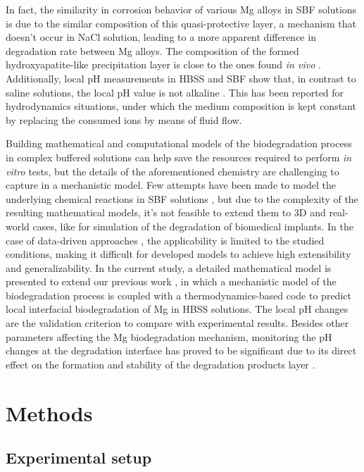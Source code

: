 In fact, the similarity in corrosion behavior of various Mg alloys in \gls{SBF} solutions is due to the similar composition of this quasi-protective layer, a mechanism that doesn't occur in NaCl solution, leading to a more apparent difference in degradation rate between Mg alloys. The composition of the formed hydroxyapatite-like precipitation layer is close to the ones found \textit{in vivo} \cite{Mei2020}. Additionally, local pH measurements in \gls{HBSS} and \gls{SBF} show that, in contrast to saline solutions, the local pH value is not alkaline \cite{Lamaka2018,Mei2021}. This has been reported for hydrodynamics situations, under which the medium composition is kept constant by replacing the consumed ions by means of fluid flow.

Building mathematical and computational models of the biodegradation process in complex buffered solutions can help save the resources required to perform \textit{in vitro} tests, but the details of the aforementioned chemistry are challenging to capture in a mechanistic model. Few attempts have been made to model the underlying chemical reactions in \gls{SBF} solutions \cite{Hoche2014,Dolgikh2019,Zeller-Plumhoff2022}, but due to the complexity of the resulting mathematical models, it's not feasible to extend them to 3D and real-world cases, like for simulation of the degradation of biomedical implants. In the case of data-driven approaches \cite{Zeller-Plumhoff2021}, the applicability is limited to the studied conditions, making it difficult for developed models to achieve high extensibility and generalizability. In the current study, a detailed mathematical model is presented to extend our previous work \cite{Barzegari2021}, in which a mechanistic model of the biodegradation process is coupled with a thermodynamics-based code to predict local interfacial biodegradation of Mg in \gls{HBSS} solutions. The local pH changes are the validation criterion to compare with experimental results. Besides other parameters affecting the Mg biodegradation mechanism, monitoring the pH changes at the degradation interface has proved to be significant due to its direct effect on the formation and stability of the degradation products layer \cite{Gonzalez2021}.


\section{Methods}

\subsection{Experimental setup}

